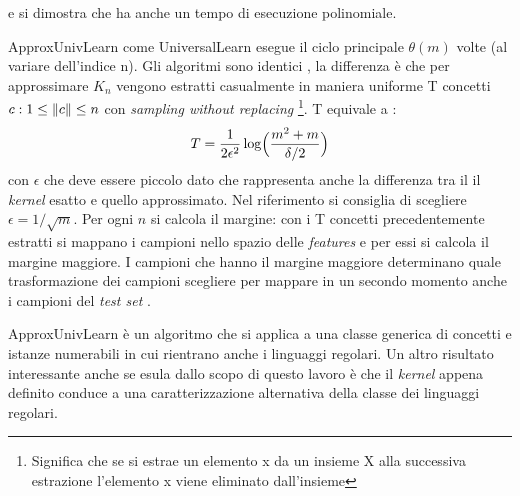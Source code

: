 e si dimostra che ha anche un tempo di esecuzione polinomiale.

ApproxUnivLearn come UniversalLearn esegue il ciclo principale $\theta(m)$ volte (al variare dell'indice n). Gli algoritmi sono identici , la differenza è che per approssimare $K_n$ vengono estratti casualmente in maniera uniforme T  concetti $c :  1 \leq \lVert c\rVert \leq n$ con \textit{sampling without replacing} \footnote{Significa che se si estrae un elemento x da un insieme X alla successiva estrazione l'elemento x viene eliminato dall'insieme}. T equivale a :
\begin{equation*}
T = \frac{1}{2\epsilon^{2}}\log\Bigl(\frac{m^{2}+m}{\delta/2}\Bigr)
\end{equation*}
con $\epsilon$ che deve essere piccolo dato che rappresenta anche la differenza tra il il \textit{kernel} esatto e quello approssimato. Nel riferimento si consiglia di scegliere $\epsilon = 1/\sqrt{m}$.  Per ogni $n$ si calcola il margine: con i T concetti precedentemente estratti si mappano i campioni nello spazio delle \textit{features} e per essi si calcola il margine maggiore. I campioni che hanno il margine maggiore determinano  quale trasformazione dei campioni scegliere per mappare in un secondo momento anche i campioni del \textit{test set} .

ApproxUnivLearn è un algoritmo che si applica a una classe generica di concetti e istanze numerabili in cui rientrano anche i linguaggi regolari. Un altro risultato interessante anche se esula dallo scopo di questo lavoro è che  il \textit{kernel} appena definito conduce a una caratterizzazione alternativa della classe dei linguaggi regolari.

